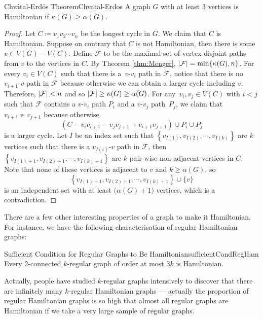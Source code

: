 \documentclass[math]{amznotes}
\theoremstyle{remark}
\newcommand{\0}{\mathbf{0}}
\newcommand{\1}{\mathbf{1}}
\begin{document}
\begin{thmbox}{Chv\'{a}tal-Erd\"{o}s Theorem}{Chvatal-Erdos}
    A graph $G$ with at least $3$ vertices is Hamiltonian if $\kappa(G) \geq \alpha(G)$.
    \tcblower
    \begin{proof}
        Let $C \coloneqq v_1v_2\cdots v_n$ be the longest cycle in $G$. We claim that $C$ is Hamiltonian. Suppose on contrary that $C$ is not Hamiltonian, then there is some $v \in V(G) - V(C)$. Define $\mathcal{F}$ to be the maximal set of vertex-disjoint paths from $v$ to the vertices in $C$. By Theorem \ref{thm:Menger}, ${\left\lvert {\mathcal{F}} \right\rvert} = \min\{\kappa(G), n\}$. For every $v_i \in V(C)$ such that there is a~$v$-$v_i$ path in $\mathcal{F}$, notice that there is no $v_{i + 1}$-$v$ path in $\mathcal{F}$ because otherwise we can obtain a larger cycle including $v$. Therefore, ${\left\lvert {\mathcal{F}} \right\rvert} < n$ and so ${\left\lvert {\mathcal{F}} \right\rvert} \geq \kappa(G) \geq \alpha(G)$. For any~$v_i, v_j \in V(C)$ with $i < j$ such that $\mathcal{F}$ contains a $v$-$v_i$ path $P_i$ and a $v$-$v_j$ path~$P_j$, we claim that $v_{i + i} \not\sim v_{j + 1}$ because otherwise 
        \begin{equation*}
            \left(C - v_iv_{i + 1} - v_jv_{j + 1} + v_{i + 1}v_{j + 1}\right) \cup P_i \cup P_j
        \end{equation*}
        is a larger cycle. Let $I$ be an index set such that $\left\{v_{I(1)}, v_{I(2)}, \cdots, v_{I(k)}\right\}$ are $k$ vertices such that there is a $v_{I(i)}$-$v$ path in $\mathcal{F}$, then $\left\{v_{I(1) + 1}, v_{I(2) + 1}, \cdots, v_{I(k) + 1}\right\}$ are $k$ pair-wise non-adjacent vertices in $C$. Note that none of these vertices is adjacent to $v$ and $k \geq \alpha(G)$, so 
        \begin{equation*}
            \left\{v_{I(1) + 1}, v_{I(2) + 1}, \cdots, v_{I(k) + 1}\right\} \cup \{v\}
        \end{equation*}
        is an independent set with at least $\bigl(\alpha(G) + 1\bigr)$ vertices, which is a contradiction.
    \end{proof}
\end{thmbox}
There are a few other interesting properties of a graph to make it Hamiltonian. For instance, we have the following characterisation of regular Hamiltonian graphs:
\begin{probox}{Sufficient Condition for Regular Graphs to Be Hamiltonian}{sufficientCondRegHam}
    Every $2$-connected $k$-regular graph of order at most $3k$ is Hamiltonian.
\end{probox}
Actually, people have studied $k$-regular graphs intensively to discover that there are infinitely many $k$-regular Hamiltonian graphs --- actually the proportion of regular Hamiltonian graphs is so high that almost all regular graphs are Hamiltonian if we take a very large sample of regular graphs.
\end{document}
